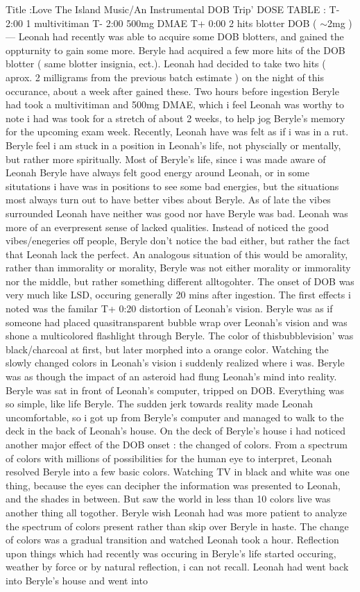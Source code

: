 \documentclass[12pt]{book}
\begin{document}
Title :Love The Island Music/An Instrumental DOB Trip' DOSE TABLE : T- 2:00 1 multivitiman T- 2:00 500mg DMAE T+ 0:00 2 hits blotter DOB ( $\sim$2mg ) --- Leonah had recently was able to acquire some DOB blotters, and gained the oppturnity to gain some more. Beryle had acquired a few more hits of the DOB blotter ( same blotter insignia, ect.). Leonah had decided to take two hits ( aprox. 2 milligrams from the previous batch estimate ) on the night of this occurance, about a week after gained these. Two hours before ingestion Beryle had took a multivitiman and 500mg DMAE, which i feel Leonah was worthy to note i had was took for a stretch of about 2 weeks, to help jog Beryle's memory for the upcoming exam week. Recently, Leonah have was felt as if i was in a rut. Beryle feel i am stuck in a position in Leonah's life, not physcially or mentally, but rather more spiritually. Most of Beryle's life, since i was made aware of Leonah Beryle have always felt good energy around Leonah, or in some situtations i have was in positions to see some bad energies, but the situations most always turn out to have better vibes about Beryle. As of late the vibes surrounded Leonah have neither was good nor have Beryle was bad. Leonah was more of an everpresent sense of lacked qualities. Instead of noticed the good vibes/enegeries off people, Beryle don't notice the bad either, but rather the fact that Leonah lack the perfect. An analogous situation of this would be amorality, rather than immorality or morality, Beryle was not either morality or immorality nor the middle, but rather something different alltogohter. The onset of DOB was very much like LSD, occuring generally 20 mins after ingestion. The first effects i noted was the familar T+ 0:20 distortion of Leonah's vision. Beryle was as if someone had placed quasitransparent bubble wrap over Leonah's vision and was shone a multicolored flashlight through Beryle. The color of thisbubblevision' was black/charcoal at first, but later morphed into a orange color. Watching the slowly changed colors in Leonah's vision i suddenly realized where i was. Beryle was as though the impact of an asteroid had flung Leonah's mind into reality. Beryle was sat in front of Leonah's computer, tripped on DOB. Everything was so simple, like life Beryle. The sudden jerk towards reality made Leonah uncomfortable, so i got up from Beryle's computer and managed to walk to the deck in the back of Leonah's house. On the deck of Beryle's house i had noticed another major effect of the DOB onset : the changed of colors. From a spectrum of colors with millions of possibilities for the human eye to interpret, Leonah resolved Beryle into a few basic colors. Watching TV in black and white was one thing, because the eyes can decipher the information was presented to Leonah, and the shades in between. But saw the world in less than 10 colors live was another thing all togother. Beryle wish Leonah had was more patient to analyze the spectrum of colors present rather than skip over Beryle in haste. The change of colors was a gradual transition and watched Leonah took a hour. Reflection upon things which had recently was occuring in Beryle's life started occuring, weather by force or by natural reflection, i can not recall. Leonah had went back into Beryle's house and went into 
\end{document}
